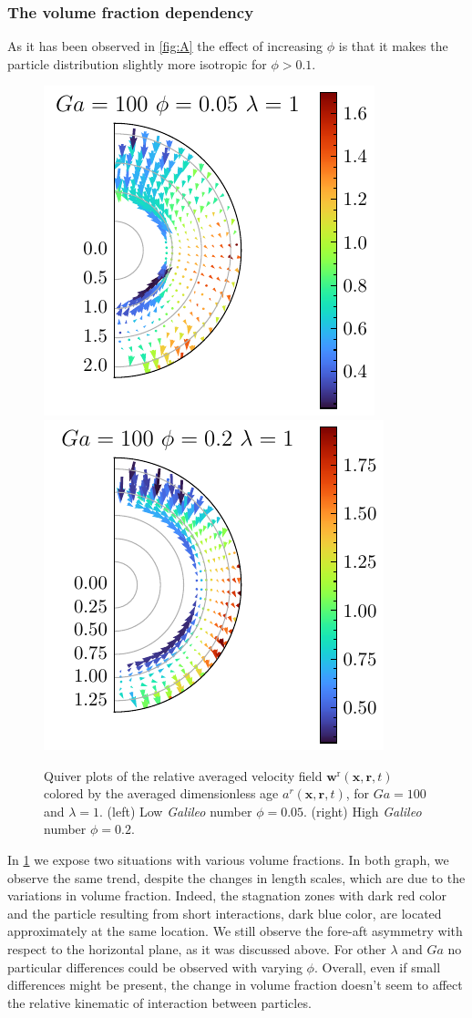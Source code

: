 \subsubsection{The volume fraction dependency}
As it has been observed in \ref{fig:A} the effect of increasing $\phi$ is that it makes the particle distribution slightly more isotropic for $\phi >0.1$. 
\begin{figure}[h!]
    \centering
    \includegraphics[height=0.35\textwidth]{image/HOMOGENEOUS_NEW/Dist/U_rel_l_1_Ga_100_PHI_5.pdf}
    \includegraphics[height=0.35\textwidth]{image/HOMOGENEOUS_NEW/Dist/U_rel_l_1_Ga_100_PHI_20.pdf}
    \caption{Quiver plots of the relative averaged velocity field $\textbf{w}^\text{r}(\textbf{x},\textbf{r},t)$ colored by the averaged dimensionless age $a^r(\textbf{x},\textbf{r},t)$, for $Ga = 100$ and $\lambda = 1$. 
    (left) Low \textit{Galileo} number $\phi = 0.05$.
    (right) High \textit{Galileo} number $\phi = 0.2$. }
    \label{fig:Why_Phi_matter}
\end{figure}
In \ref{fig:Why_Phi_matter} we expose two situations with various volume fractions. 
In both graph, we observe the same trend, despite the changes in length scales, which are due to the variations in volume fraction. 
Indeed, the stagnation zones with dark red color and the particle resulting from short interactions, dark blue color, are located approximately at the same location. 
We still observe the fore-aft asymmetry with respect to the horizontal plane, as it was discussed above. 
For other $\lambda$ and $Ga$ no particular differences could be observed with varying $\phi$. 
Overall, even if small differences might be present, the change in volume fraction doesn't seem to affect the relative kinematic of interaction between particles. 

